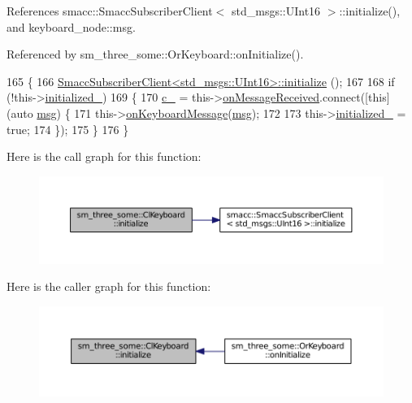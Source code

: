 References smacc\+::\+Smacc\+Subscriber\+Client$<$ std\+\_\+msgs\+::\+U\+Int16 $>$\+::initialize(), and keyboard\+\_\+node\+::msg.



Referenced by sm\+\_\+three\+\_\+some\+::\+Or\+Keyboard\+::on\+Initialize().


\begin{DoxyCode}
165         \{
166                 \hyperlink{classsmacc_1_1SmaccSubscriberClient_acfa97685ecc588fe61eb57002354b58a}{SmaccSubscriberClient<std\_msgs::UInt16>::initialize}
      ();
167 
168                 \textcolor{keywordflow}{if} (!this->\hyperlink{classsm__three__some_1_1ClKeyboard_aec79ba7c7e1005a0e27e44cebf48e93e}{initialized\_})
169                 \{
170                         \hyperlink{classsm__three__some_1_1ClKeyboard_a6e57fd1ed7509656887b8e939b90178c}{c\_} = this->\hyperlink{classsmacc_1_1SmaccSubscriberClient_a7635fbb013c6fdbc3998da11b44766bb}{onMessageReceived}.connect([\textcolor{keyword}{this}](\textcolor{keyword}{auto} 
      \hyperlink{namespacekeyboard__node_a768777e12f75b89e4a0a60acf748e9eb}{msg}) \{
171                                 this->\hyperlink{classsm__three__some_1_1ClKeyboard_ad6f5619d4c4875a6d0dc8262ab49e10f}{onKeyboardMessage}(\hyperlink{namespacekeyboard__node_a768777e12f75b89e4a0a60acf748e9eb}{msg});
172 
173                                 this->\hyperlink{classsm__three__some_1_1ClKeyboard_aec79ba7c7e1005a0e27e44cebf48e93e}{initialized\_} = \textcolor{keyword}{true};
174                         \});
175                 \}
176         \}
\end{DoxyCode}


Here is the call graph for this function\+:
\nopagebreak
\begin{figure}[H]
\begin{center}
\leavevmode
\includegraphics[width=350pt]{classsm__three__some_1_1ClKeyboard_adbc06c9dc3a4a5b266ff70a4300dcdeb_cgraph}
\end{center}
\end{figure}




Here is the caller graph for this function\+:
\nopagebreak
\begin{figure}[H]
\begin{center}
\leavevmode
\includegraphics[width=350pt]{classsm__three__some_1_1ClKeyboard_adbc06c9dc3a4a5b266ff70a4300dcdeb_icgraph}
\end{center}
\end{figure}


